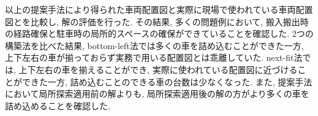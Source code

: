 以上の提案手法により得られた車両配置図と実際に現場で使われている車両配置図とを比較し, 解の評価を行った. 
その結果, 多くの問題例において, 搬入搬出時の経路確保と駐車時の局所的スペースの確保ができていることを確認した. 
2つの構築法を比べた結果, bottom-left法では多くの車を詰め込むことができた一方, 上下左右の車が揃っておらず実務で用いる配置図とは乖離していた. 
next-fit法では, 上下左右の車を揃えることができ, 実際に使われている配置図に近づけることができた一方, 詰め込むことのできる車の台数は少なくなった.  
また, 提案手法において局所探索適用前の解よりも, 局所探索適用後の解の方がより多くの車を詰め込めることを確認した. 
